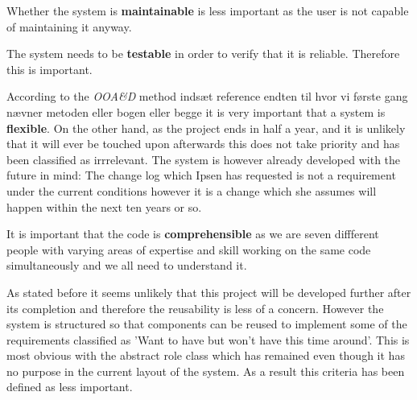 Whether the system is \textbf{maintainable} is less important as the user is not capable of maintaining it anyway.

The system needs to be \textbf{testable} in order to verify that it is reliable. Therefore this is important.

According to the \textit{OOA\&D} method {\color{red}indsæt reference endten til hvor vi første gang nævner metoden eller bogen eller begge} it is very important that a system is \textbf{flexible}.
On the other hand, as the project ends in half a year, and it is unlikely that it will ever be touched upon afterwards this does not take priority and has been classified as irrrelevant.
The system is however already developed with the future in mind: The change log which Ipsen has requested is not a requirement under the current conditions however it is a change which she assumes will happen within the next ten years or so.

It is important that the code is \textbf{comprehensible} as we are seven diffferent people with varying areas of expertise and skill working on the same code simultaneously and we all need to understand it.

As stated before it seems unlikely that this project will be developed further after its completion and therefore the reusability is less of a concern.
However the system is structured so that components can be reused to implement some of the requirements classified as 'Want to have but won't have this time around'.
This is most obvious with the abstract role class which has remained even though it has no purpose in the current layout of the system. 
As a result this criteria has been defined as less important.

